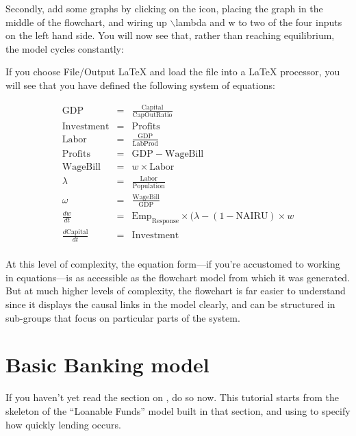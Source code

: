 
Secondly, add some graphs by clicking on the
 icon, placing the graph
in the middle of the flowchart, and wiring up $\backslash$lambda and w to two of
the four inputs on the left hand side. You will now see that, rather
than reaching equilibrium, the model cycles constantly:


If you choose File/Output LaTeX and load the file into a LaTeX
processor, you will see that you have defined the following system of
equations:

\begin{eqnarray*}
\mathrm{GDP}&=&\frac{\mathrm{Capital}}{\mathrm{CapOutRatio}}\\
\mathrm{Investment}&=&\mathrm{Profits}\\
\mathrm{Labor}&=&\frac{\mathrm{GDP}}{\mathrm{LabProd}}\\
\mathrm{Profits}&=&\mathrm{GDP}-\mathrm{WageBill}\\
\mathrm{WageBill}&=&w\times\mathrm{Labor}\\
\lambda&=&\frac{\mathrm{Labor}}{\mathrm{Population}}\\
\omega&=&\frac{\mathrm{WageBill}}{\mathrm{GDP}}\\
\frac{dw}{dt}&=&\mathrm{Emp}_\mathrm{Response}\times(\lambda-(1-\mathrm{NAIRU})
        \times w\\
\frac{d\mathrm{Capital}}{dt}&=&\mathrm{Investment}\\
\end{eqnarray*}


At this level of complexity, the equation form---if you're accustomed
to working in equations---is as accessible as the flowchart model from
which it was generated. But at much higher levels of complexity, the
flowchart is far easier to understand since it displays the causal
links in the model clearly, and can be structured in sub-groups that
focus on particular parts of the system. 

\section{Basic Banking model}\label{tut:basicBankModel}

If you haven't yet read the section on , do so now. This tutorial starts from the
skeleton of the ``Loanable Funds'' model built in that section, and
using  to specify how quickly
lending occurs.  



